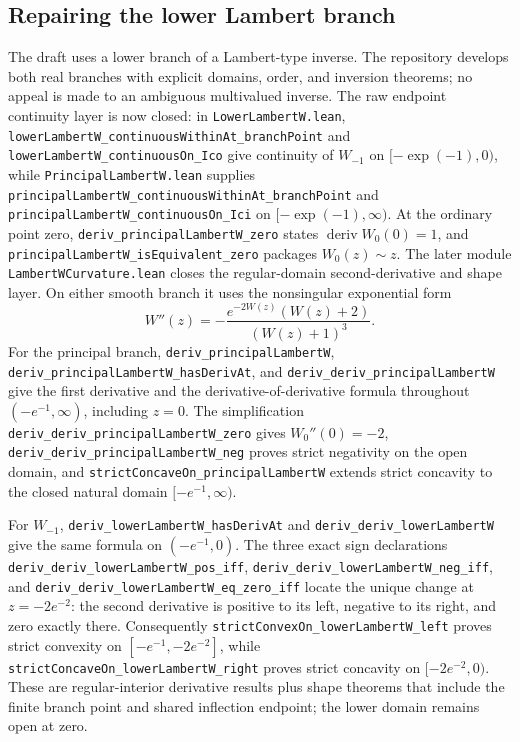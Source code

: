 \documentclass[11pt,oneside]{article}
\theoremstyle{definition}
\theoremstyle{remark}
\begin{document}
\subsection{Repairing the lower Lambert branch}
The draft uses a lower branch of a Lambert-type inverse.  The repository
develops both real branches with explicit domains, order, and inversion
theorems; no appeal is made to an ambiguous multivalued inverse.  The raw
endpoint continuity layer is now closed: in \nolinkurl{LowerLambertW.lean},
\nolinkurl{lowerLambertW_continuousWithinAt_branchPoint} and
\nolinkurl{lowerLambertW_continuousOn_Ico} give continuity of \(W_{-1}\) on
\([-\exp(-1),0)\), while \nolinkurl{PrincipalLambertW.lean} supplies
\nolinkurl{principalLambertW_continuousWithinAt_branchPoint} and
\nolinkurl{principalLambertW_continuousOn_Ici} on
\([-\exp(-1),\infty)\).  At the ordinary point zero,
\nolinkurl{deriv_principalLambertW_zero} states
\(\operatorname{deriv}W_0(0)=1\), and
\nolinkurl{principalLambertW_isEquivalent_zero} packages \(W_0(z)\sim z\).
The later module \nolinkurl{LambertWCurvature.lean} closes the regular-domain
second-derivative and shape layer.  On either smooth branch it uses the
nonsingular exponential form
\[
 W''(z)=-\frac{e^{-2W(z)}(W(z)+2)}{(W(z)+1)^3}.
\]
For the principal branch, \nolinkurl{deriv_principalLambertW},
\nolinkurl{deriv_principalLambertW_hasDerivAt}, and
\nolinkurl{deriv_deriv_principalLambertW} give the first derivative and the
derivative-of-derivative formula throughout
\((-e^{-1},\infty)\), including \(z=0\).  The simplification
\nolinkurl{deriv_deriv_principalLambertW_zero} gives \(W_0''(0)=-2\),
\nolinkurl{deriv_deriv_principalLambertW_neg} proves strict negativity on the
open domain, and \nolinkurl{strictConcaveOn_principalLambertW} extends strict
concavity to the closed natural domain \([-e^{-1},\infty)\).

For \(W_{-1}\), \nolinkurl{deriv_lowerLambertW_hasDerivAt} and
\nolinkurl{deriv_deriv_lowerLambertW} give the same formula on
\((-e^{-1},0)\).  The three exact sign declarations
\nolinkurl{deriv_deriv_lowerLambertW_pos_iff},
\nolinkurl{deriv_deriv_lowerLambertW_neg_iff}, and
\nolinkurl{deriv_deriv_lowerLambertW_eq_zero_iff} locate the unique change at
\(z=-2e^{-2}\): the second derivative is positive to its left, negative to
its right, and zero exactly there.  Consequently
\nolinkurl{strictConvexOn_lowerLambertW_left} proves strict convexity on
\([-e^{-1},-2e^{-2}]\), while
\nolinkurl{strictConcaveOn_lowerLambertW_right} proves strict concavity on
\([-2e^{-2},0)\).  These are regular-interior derivative results plus shape
theorems that include the finite branch point and shared inflection endpoint;
the lower domain remains open at zero.
\end{document}
